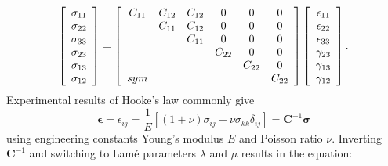 \documentclass[m,times]{cgMA}
\begin{document}
\begin{equation} \label{eq:voigt}
  \left[ \begin{array} {c}
      {\sigma_{11}}\\
      {\sigma_{22}}\\
      {\sigma_{33}}\\
      {\sigma_{23}}\\
      {\sigma_{13}}\\
      {\sigma_{12}}\\
  \end{array} \right]
  = \left[ \begin{array} { c c c c c c }
      { C _ { 11 }   } & { C _ { 12 } } & { C _ { 12 } } & 0                & 0                & 0 \\
      {}               & { C _ { 11 } } & { C _ { 12 } } & 0                & 0                & 0 \\
      {}               & {}             & { C _ { 11 } } & 0                & 0                & 0 \\
      {}               & {}             & {}             & { C _ { 22 } }   & 0                & 0 \\
      {}               & {}             & {}             & {}               & { C _ { 22 } }   & 0 \\
      {sym}            & {}             & {}             & {}               & {}               & { C _ { 22 } } \\
  \end{array} \right]
  \left[ \begin{array} {c}
      {\epsilon_{11}}\\
      {\epsilon_{22}}\\
      {\epsilon_{33}}\\
      {\gamma_{23}}\\
      {\gamma_{13}}\\
      {\gamma_{12}}\\
  \end{array} \right].
\end{equation}
Experimental results of Hooke's law commonly give
\begin{equation}
  \boldsymbol{\epsilon} =
  \epsilon _ { i j } = \frac { 1 } { E } \left[ ( 1 + \nu ) \sigma _ { i j } - \nu \sigma _ { k k } \delta _ { i j } \right]
  = \boldsymbol{C}^{-1} \bm{\sigma}
\end{equation}
using engineering constants Young's modulus $E$ and Poisson ratio $\nu$. Inverting $\boldsymbol{C}^{-1}$ and switching to Lamé parameters $\lambda$ and $\mu$ results in the equation:
\end{document}
